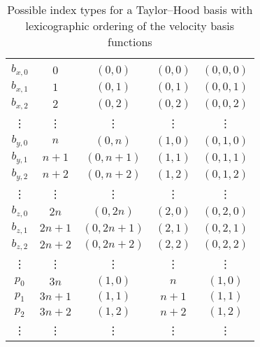 \documentclass[a4paper,10pt,headings=normal,bibliography=totoc]{scrartcl}
\begin{document}
\begin{table}
 \begin{center}
 \begin{tabular}{c|c|c|c|c}
 \hline \\
  $b_{x,0}$  & $0$    & $(0,0)$ & $(0,0)$ & $(0,0,0)$ \\
  $b_{x,1}$  & $1$    & $(0,1)$ & $(0,1)$ & $(0,0,1)$ \\
  $b_{x,2}$  & $2$    & $(0,2)$ & $(0,2)$ & $(0,0,2)$ \\
    \vdots   & \vdots & \vdots  & \vdots  & \vdots  \\
  $b_{y,0}$  & $n$    & $(0,n)$ & $(1,0)$ & $(0,1,0)$ \\
  $b_{y,1}$  & $n+1$  & $(0,n+1)$ & $(1,1)$ & $(0,1,1)$ \\
  $b_{y,2}$  & $n+2$  & $(0,n+2)$ & $(1,2)$ & $(0,1,2)$ \\
    \vdots   & \vdots & \vdots  & \vdots  & \vdots  \\
  $b_{z,0}$  & $2n$   & $(0,2n)$ & $(2,0)$ & $(0,2,0)$ \\
  $b_{z,1}$  & $2n+1$ & $(0,2n+1)$ & $(2,1)$ & $(0,2,1)$ \\
  $b_{z,2}$  & $2n+2$ & $(0,2n+2)$ & $(2,2)$ & $(0,2,2)$ \\
    \vdots   & \vdots & \vdots  & \vdots  & \vdots  \\
  $p_0$      & $3n$   & $(1,0)$ & $n$ & $(1,0)$ \\
  $p_1$      & $3n+1$ & $(1,1)$ & $n+1$ & $(1,1)$ \\
  $p_2$      & $3n+2$ & $(1,2)$ & $n+2$ & $(1,2)$ \\
    \vdots   & \vdots & \vdots  & \vdots  & \vdots
 \end{tabular}
 \end{center}
 \caption{Possible index types for a Taylor--Hood basis with lexicographic ordering of the velocity basis functions}
 \label{tbl:th_multiindices_lexicographic}
\end{table}
\end{document}
